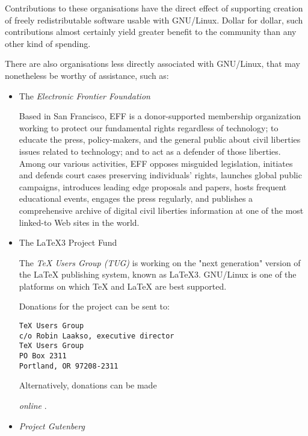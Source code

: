 Contributions to these organisations have the direct effect of
supporting creation of freely redistributable software usable with
GNU/Linux.  Dollar for dollar, such contributions almost certainly yield
greater benefit to the community than any other kind of spending.



 
There are also organisations less directly associated with GNU/Linux, that
may nonetheless be worthy of assistance, such as:

\begin{itemize}
\item The 
\emph{Electronic Frontier Foundation} \texttt{\adourl}
 

Based in San Francisco, EFF is a donor-supported membership organization
working to protect our fundamental rights regardless of technology; to
educate the press, policy-makers, and the general public about civil
liberties issues related to technology; and to act as a defender of 
those liberties. Among our various activities, EFF opposes misguided
legislation, initiates and defends court cases preserving individuals'
rights, launches global public campaigns, introduces leading edge
proposals and papers, hosts frequent educational events, engages the
press regularly, and publishes a comprehensive archive of digital civil
liberties information at one of the most linked-to Web sites in the
world.



\item The LaTeX3 Project Fund 

 
The 
\emph{TeX Users Group (TUG)} \texttt{\adpurl}
 is
working on the "next generation" version of the LaTeX publishing
system, known as LaTeX3.  GNU/Linux is one of the platforms on which TeX
and LaTeX are best supported.

 Donations for the project can be sent to:
\begin{tscreen}
\begin{verbatim}
TeX Users Group
c/o Robin Laakso, executive director
TeX Users Group
PO Box 2311
Portland, OR 97208-2311
\end{verbatim}
\end{tscreen}


Alternatively, donations can be made 

\emph{online} \texttt{\adqurl}
.



\item  
\emph{Project Gutenberg} \texttt{\adrurl}
 


\end{itemize}
